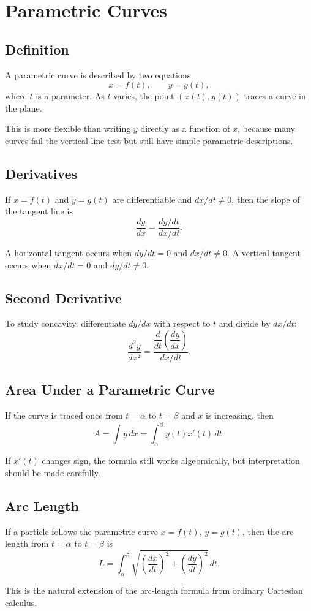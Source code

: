 \chapter*{Parametric Curves}

\section*{Definition}

A parametric curve is described by two equations
$$x=f(t), \qquad y=g(t),$$
where $t$ is a parameter. As $t$ varies, the point $(x(t),y(t))$ traces a curve in the plane.

This is more flexible than writing $y$ directly as a function of $x$, because many curves fail the vertical line test but still have simple parametric descriptions.

\section*{Derivatives}

If $x=f(t)$ and $y=g(t)$ are differentiable and $dx/dt\neq 0$, then the slope of the tangent line is
$$\frac{dy}{dx} = \frac{dy/dt}{dx/dt}.$$ 

\begin{remark}
A horizontal tangent occurs when $dy/dt=0$ and $dx/dt\neq 0$. A vertical tangent occurs when $dx/dt=0$ and $dy/dt\neq 0$.
\end{remark}

\section*{Second Derivative}

To study concavity, differentiate $dy/dx$ with respect to $t$ and divide by $dx/dt$:
$$\frac{d^2y}{dx^2} = \frac{\dfrac{d}{dt}\left(\dfrac{dy}{dx}\right)}{dx/dt}.$$ 

\section*{Area Under a Parametric Curve}

If the curve is traced once from $t=\alpha$ to $t=\beta$ and $x$ is increasing, then
$$A = \int y\,dx = \int_{\alpha}^{\beta} y(t)x'(t)\,dt.$$ 

If $x'(t)$ changes sign, the formula still works algebraically, but interpretation should be made carefully.

\section*{Arc Length}

If a particle follows the parametric curve $x=f(t)$, $y=g(t)$, then the arc length from $t=\alpha$ to $t=\beta$ is
$$L = \int_{\alpha}^{\beta} \sqrt{\left(\frac{dx}{dt}\right)^2+\left(\frac{dy}{dt}\right)^2}\,dt.$$ 

This is the natural extension of the arc-length formula from ordinary Cartesian calculus.